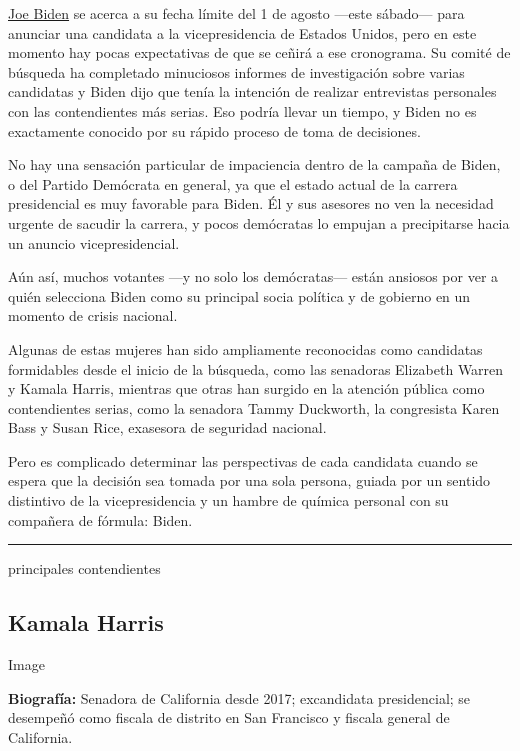 \href{https://www.nytimes.com/es/interactive/2020/espanol/estados-unidos/joe-biden-elecciones.html}{Joe
Biden} se acerca a su fecha límite del 1 de agosto ---este sábado---
para anunciar una candidata a la vicepresidencia de Estados Unidos, pero
en este momento hay pocas expectativas de que se ceñirá a ese
cronograma. Su comité de búsqueda ha completado minuciosos informes de
investigación sobre varias candidatas y Biden dijo que tenía la
intención de realizar entrevistas personales con las contendientes más
serias. Eso podría llevar un tiempo, y Biden no es exactamente conocido
por su rápido proceso de toma de decisiones.

No hay una sensación particular de impaciencia dentro de la campaña de
Biden, o del Partido Demócrata en general, ya que el estado actual de la
carrera presidencial es muy favorable para Biden. Él y sus asesores no
ven la necesidad urgente de sacudir la carrera, y pocos demócratas lo
empujan a precipitarse hacia un anuncio vicepresidencial.

Aún así, muchos votantes ---y no solo los demócratas--- están ansiosos
por ver a quién selecciona Biden como su principal socia política y de
gobierno en un momento de crisis nacional.

Algunas de estas mujeres han sido ampliamente reconocidas como
candidatas formidables desde el inicio de la búsqueda, como las
senadoras Elizabeth Warren y Kamala Harris, mientras que otras han
surgido en la atención pública como contendientes serias, como la
senadora Tammy Duckworth, la congresista Karen Bass y Susan Rice,
exasesora de seguridad nacional.

Pero es complicado determinar las perspectivas de cada candidata cuando
se espera que la decisión sea tomada por una sola persona, guiada por un
sentido distintivo de la vicepresidencia y un hambre de química personal
con su compañera de fórmula: Biden.

\begin{center}\rule{0.5\linewidth}{\linethickness}\end{center}

principales contendientes

\hypertarget{kamala-harris}{%
\subsection{Kamala Harris}\label{kamala-harris}}

Image

\textbf{Biografía:} Senadora de California desde 2017; excandidata
presidencial; se desempeñó como fiscala de distrito en San Francisco y
fiscala general de California.

